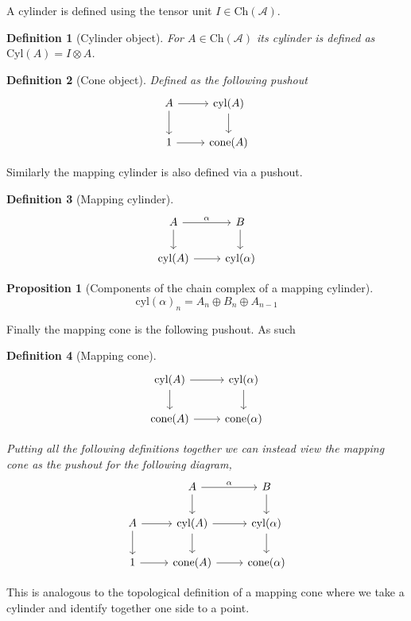 \documentclass[12pt]{article}
\numberwithin{equation}{section}
\newtheorem{definition}{Definition}[section]
\newtheorem{proposition}{Proposition}[section]
\begin{document}
	A cylinder is defined using the tensor unit $I\in \mathrm{Ch}(\mathcal{A})$.
	\begin{definition}[Cylinder object]
		For $A \in \mathrm{Ch}(\mathcal{A})$ its cylinder is defined as $\mathrm{Cyl}(A)=I \otimes A$.
	\end{definition}
	\begin{definition}[Cone object]
		Defined as the following pushout
	\[\begin{tikzcd}
		A & {\mathrm{cyl}(A)} \\
		1 & {\mathrm{cone}(A)}
		\arrow[from=1-1, to=1-2]
		\arrow[from=1-1, to=2-1]
		\arrow[from=2-1, to=2-2]
		\arrow[from=1-2, to=2-2]
	\end{tikzcd}\]
	\end{definition}
	Similarly the mapping cylinder is also defined via a pushout.
	\begin{definition}[Mapping cylinder]\label{mappingcylinder}
		\[\begin{tikzcd}
			A & B \\
			{\mathrm{cyl}(A)} & {\mathrm{cyl}(\alpha)}
			\arrow["\alpha", from=1-1, to=1-2]
			\arrow[from=1-1, to=2-1]
			\arrow[from=1-2, to=2-2]
			\arrow[from=2-1, to=2-2]
		\end{tikzcd}\]
	
	\end{definition}
	
	\begin{proposition}[Components of the chain complex of a mapping cylinder]
		\[ \mathrm{cyl}(\alpha)_n=A_n\oplus B_n \oplus A_{n-1} \]
	\end{proposition}

Finally the mapping cone is the following pushout. As such 
\begin{definition}[Mapping cone]\label{mappingcone}
	\[\begin{tikzcd}
		{\mathrm{cyl}(A)} & {\mathrm{cyl}(\alpha)} \\
		{\mathrm{cone}(A)} & {\mathrm{cone}(\alpha)}
		\arrow[from=1-1, to=1-2]
		\arrow[from=1-1, to=2-1]
		\arrow[from=1-2, to=2-2]
		\arrow[from=2-1, to=2-2]
	\end{tikzcd}\]
	
		Putting all the following definitions together we can instead view the mapping cone as the pushout for the following diagram,
	\[\begin{tikzcd}
		& A & B \\
		A & {\mathrm{cyl}(A)} & {\mathrm{cyl}(\alpha)} \\
		1 & {\mathrm{cone}(A)} & {\mathrm{cone}(\alpha)}
		\arrow[from=2-2, to=2-3]
		\arrow[from=2-2, to=3-2]
		\arrow[from=2-3, to=3-3]
		\arrow[from=3-2, to=3-3]
		\arrow["\alpha", from=1-2, to=1-3]
		\arrow[from=1-2, to=2-2]
		\arrow[from=1-3, to=2-3]
		\arrow[from=2-1, to=2-2]
		\arrow[from=2-1, to=3-1]
		\arrow[from=3-1, to=3-2]
	\end{tikzcd}\]
\end{definition}
This is analogous to the topological definition of a mapping cone where we take a cylinder and identify together one side to a point.
\end{document}
